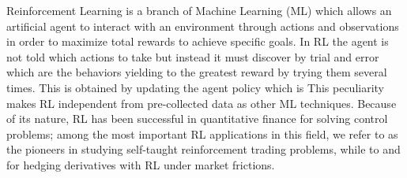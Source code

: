 \documentclass[11pt]{article}
\begin{document}
Reinforcement Learning is a branch of Machine Learning (ML) which allows an artificial agent to interact with an environment through actions and observations in order to maximize total rewards to achieve specific goals. In RL the agent is not told which actions to take but instead it must discover by trial and error which are the behaviors yielding to the greatest reward by trying them several times. This is obtained by updating the agent policy which is  This peculiarity makes RL independent from pre-collected data as other ML techniques. Because of its nature, RL has been successful in quantitative finance for solving control problems; among the most important RL applications in this field, we refer to \textcite{pioneerrlfinance} as the pioneers in studying self-taught reinforcement trading problems, while to \textcite{rlintroductionfinance} and \textcite{rlfinance} for hedging derivatives with RL under market frictions.



\begin{comment}
\section{Numerical Investigation}
Dire qui che abbiamo lavorato con l'implementazione di OpenAi 


The actions of the agent as a function of its observations of the environment are termed the agent policy.  In our case the policy is the asset allocation weights $\alpha$, while the rewards are the costs generated by hedging a derivative contract on the TVS. Once the agent is trained, and the optimal policy is selected, we can run a Monte Carlo simulation to calculate the option price on the TVS. 
 
 We adopt as learning strategy the PPO algoritm developed in \textcite{ppo} and \textcite{gae}. We have 
\end{comment}
\cleardoublepage
\printbibliography
\end{document}
